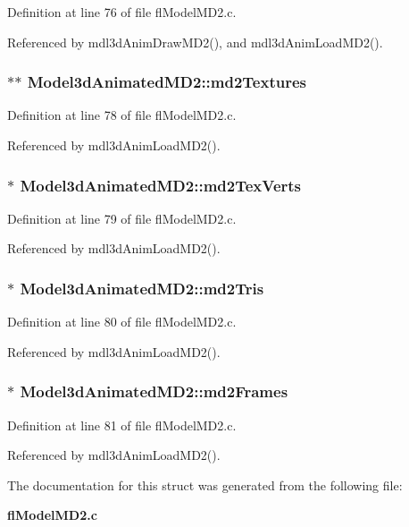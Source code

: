 Definition at line 76 of file fl\-Model\-MD2.c.

Referenced by mdl3d\-Anim\-Draw\-MD2(), and mdl3d\-Anim\-Load\-MD2().
\subsubsection{$\ast$$\ast$ {\bf Model3d\-Animated\-MD2::md2Textures}}\label{structModel3dAnimatedMD2_e59e1d97875561efa3760d1380f861b2}




Definition at line 78 of file fl\-Model\-MD2.c.

Referenced by mdl3d\-Anim\-Load\-MD2().
\subsubsection{$\ast$ {\bf Model3d\-Animated\-MD2::md2Tex\-Verts}}\label{structModel3dAnimatedMD2_93a4f5c4330f3c40e7f1be861673c0e2}




Definition at line 79 of file fl\-Model\-MD2.c.

Referenced by mdl3d\-Anim\-Load\-MD2().
\subsubsection{$\ast$ {\bf Model3d\-Animated\-MD2::md2Tris}}\label{structModel3dAnimatedMD2_34b41f04ea13c17fb91e8274351e4430}




Definition at line 80 of file fl\-Model\-MD2.c.

Referenced by mdl3d\-Anim\-Load\-MD2().
\subsubsection{$\ast$ {\bf Model3d\-Animated\-MD2::md2Frames}}\label{structModel3dAnimatedMD2_426ee1b3fd1199dcda98cc151f468749}




Definition at line 81 of file fl\-Model\-MD2.c.

Referenced by mdl3d\-Anim\-Load\-MD2().

The documentation for this struct was generated from the following file:\begin{CompactItemize}
\item 
{\bf fl\-Model\-MD2.c}\end{CompactItemize}
